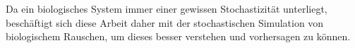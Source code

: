 
Da ein biologisches System immer einer gewissen Stochastizität unterliegt, beschäftigt sich diese Arbeit daher mit der stochastischen Simulation von biologischem Rauschen, um dieses besser verstehen und vorhersagen zu können.